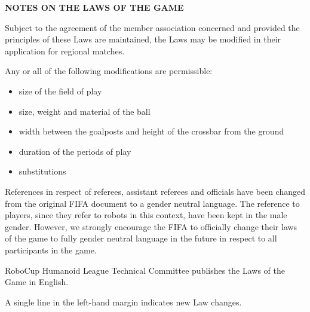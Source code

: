 \clearpage
\sffamily
{\bfseries\color[rgb]{0.4,0.4,0.4}
NOTES ON THE LAWS OF THE GAME }

\bigskip

{\color[rgb]{0.4,0.4,0.4}{Modifications} }

Subject to the agreement of the member association concerned and provided the principles of these Laws are maintained, the Laws may be modified in their application for regional matches.

Any or all of the following modifications are permissible: 

\begin{itemize}
\item size of the field of play
\item size, weight and material of the ball
\item width between the goalposts and height of the crossbar from the ground
\item duration of the periods of play
\item substitutions
\end{itemize}

\bigskip

{\color[rgb]{0.4,0.4,0.4}{Male and Female}}

References in respect of referees, assistant referees and officials have been changed from the original FIFA document to a gender neutral language. The reference to players, since they refer to robots in this context, have been kept in the male gender. However, we strongly encourage the FIFA to officially change their laws of the game to fully gender neutral language in the future in respect to all participants in the game.


\bigskip

{\color[rgb]{0.4,0.4,0.4}{Official languages}}

RoboCup Humanoid League Technical Committee publishes the Laws of the Game in English.

\bigskip

{\color[rgb]{0.4,0.4,0.4}{Key} }

A single line in the left-hand margin indicates new Law changes.